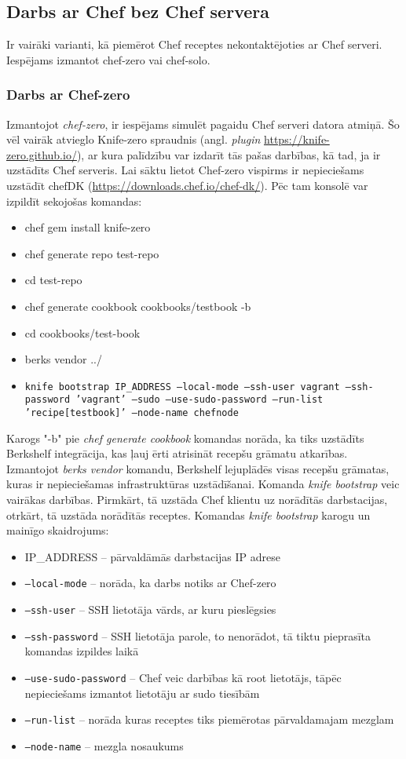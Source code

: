 \subsection{Darbs ar Chef bez Chef servera}
Ir vairāki varianti, kā piemērot Chef receptes nekontaktējoties ar Chef serveri. Iespējams izmantot chef-zero vai chef-solo.
\subsubsection{Darbs ar Chef-zero}
Izmantojot \textit{chef-zero}, ir iespējams simulēt pagaidu Chef serveri datora atmiņā. Šo vēl vairāk atvieglo Knife-zero spraudnis (angl. \textit{plugin} \url{https://knife-zero.github.io/}), ar kura palīdzību var izdarīt tās pašas darbības, kā tad, ja ir uzstādīts Chef serveris.
Lai sāktu lietot Chef-zero vispirms ir nepieciešams uzstādīt chefDK (\url{https://downloads.chef.io/chef-dk/}).
Pēc tam konsolē var izpildīt sekojošas komandas:
\begin{itemize}
  \item chef gem install knife-zero
  \item chef generate repo test-repo
  \item cd test-repo
  \item chef generate cookbook cookbooks/testbook -b
  \item cd cookbooks/test-book
  \item berks vendor ../
  \item \texttt{knife bootstrap IP_ADDRESS --local-mode --ssh-user vagrant --ssh-password 'vagrant' --sudo --use-sudo-password --run-list 'recipe[testbook]' --node-name chefnode}
\end{itemize}
Karogs "-b" pie \textit{chef generate cookbook} komandas norāda, ka tiks uzstādīts Berkshelf integrācija, kas ļauj ērti atrisināt recepšu grāmatu atkarības.
Izmantojot \textit{berks vendor} komandu, Berkshelf lejuplādēs visas recepšu grāmatas, kuras ir nepieciešamas infrastruktūras uzstādīšanai.
Komanda \textit{knife bootstrap} veic vairākas darbības. Pirmkārt, tā uzstāda Chef klientu uz norādītās darbstacijas, otrkārt, tā uzstāda norādītās receptes.
Komandas \textit{knife bootstrap} karogu un mainīgo skaidrojums:
\begin{itemize}
	\item IP_ADDRESS -- pārvaldāmās darbstacijas IP adrese
	\item \texttt{--local-mode} -- norāda, ka darbs notiks ar Chef-zero
	\item \texttt{--ssh-user} -- SSH lietotāja vārds, ar kuru pieslēgsies
	\item \texttt{--ssh-password} -- SSH lietotāja parole, to nenorādot, tā tiktu pieprasīta komandas izpildes laikā
	\item \texttt{--use-sudo-password} -- Chef veic darbības kā root lietotājs, tāpēc nepieciešams izmantot lietotāju ar sudo tiesībām
	\item \texttt{--run-list} -- norāda kuras receptes tiks piemērotas pārvaldamajam mezglam
	\item \texttt{--node-name} -- mezgla nosaukums
\end{itemize}

